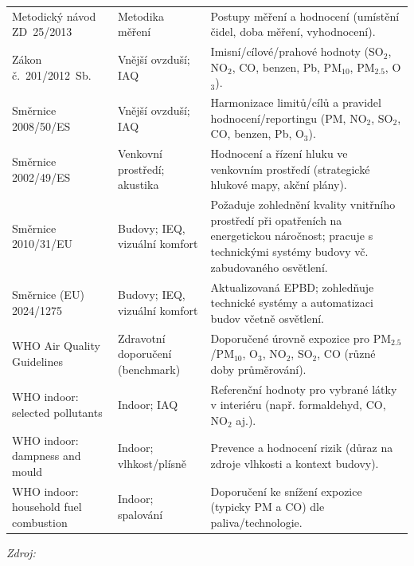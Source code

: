 \begin{table}[p]
\begin{center}
\begin{tabularx}{\textwidth}{@{}
>{\raggedright\arraybackslash}p{}
  >{\raggedright\arraybackslash}p{}
  X@{}}
Metodický návod ZD~25/2013 &
Metodika měření &
Postupy měření a hodnocení (umístění čidel, doba měření, vyhodnocení). \\

Zákon č.~201/2012~Sb. &
Vnější ovzduší; IAQ &
Imisní/cílové/prahové hodnoty (SO$_2$, NO$_2$, CO, benzen, Pb, PM$_{10}$, PM$_{2.5}$, O$_3$). \\

\midrule
Směrnice 2008/50/ES &
Vnější ovzduší; IAQ &
Harmonizace limitů/cílů a pravidel hodnocení/reportingu (PM, NO$_2$, SO$_2$, CO, benzen, Pb, O$_3$). \\

Směrnice 2002/49/ES &
Venkovní prostředí; akustika &
Hodnocení a řízení hluku ve venkovním prostředí (strategické hlukové mapy, akční plány). \\

Směrnice 2010/31/EU &
Budovy; IEQ, vizuální komfort &
Požaduje zohlednění kvality vnitřního prostředí při opatřeních na energetickou náročnost; pracuje s technickými systémy budovy vč. zabudovaného osvětlení. \\

Směrnice (EU) 2024/1275 &
Budovy; IEQ, vizuální komfort &
Aktualizovaná EPBD; zohledňuje technické systémy a automatizaci budov včetně osvětlení. \\

\midrule
WHO Air Quality Guidelines &
Zdravotní doporučení (benchmark) &
Doporučené úrovně expozice pro PM$_{2.5}$/PM$_{10}$, O$_3$, NO$_2$, SO$_2$, CO (různé doby průměrování). \\

WHO indoor: selected pollutants &
Indoor; IAQ &
Referenční hodnoty pro vybrané látky v interiéru (např. formaldehyd, CO, NO$_2$ aj.). \\

WHO indoor: dampness and mould &
Indoor; vlhkost/plísně &
Prevence a hodnocení rizik (důraz na zdroje vlhkosti a kontext budovy). \\

WHO indoor: household fuel combustion &
Indoor; spalování &
Doporučení ke snížení expozice (typicky PM a CO) dle paliva/technologie. \\

\bottomrule
\end{tabularx}
\end{center}

\footnotesize \textit{Zdroj:} \parencite{wolterskluwerZakon2582000,info@wolterskluwer.czVyhlaska432025,info@wolterskluwer.czZakon2832021,wolterskluwerNarizeni36120072007,info@wolterskluwer.czNarizeni2722011,MetodickyNavodZD252013,wolterskluwerZakon20120122012,SmerniceEvropskehoParlamentu2008,SmerniceEvropskehoParlamentu2002,SmerniceEvropskehoParlamentu2010,SmerniceEvropskehoParlamentu2024a,worldhealthorganizationWHOGlobalAir2021,adamkiewiczWHOGuidelinesIndoor2010,heseltine2009guidelines,world2014guidelines}
\end{table}

